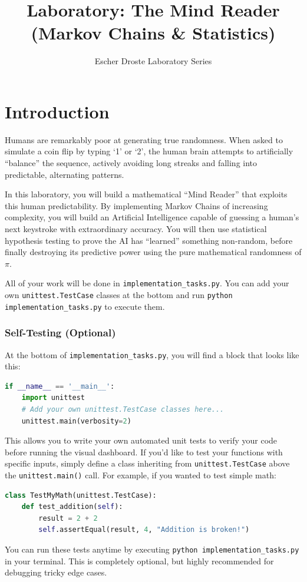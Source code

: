 \documentclass[12pt]{article}
\title{Laboratory: The Mind Reader (Markov Chains \& Statistics)}
\author{Escher Droste Laboratory Series}
\date{}
\begin{document}
\maketitle

\section*{Introduction}
Humans are remarkably poor at generating true randomness. When asked to simulate a coin flip by typing `1' or `2', the human brain attempts to artificially ``balance'' the sequence, actively avoiding long streaks and falling into predictable, alternating patterns.

In this laboratory, you will build a mathematical ``Mind Reader'' that exploits this human predictability. By implementing Markov Chains of increasing complexity, you will build an Artificial Intelligence capable of guessing a human's next keystroke with extraordinary accuracy. You will then use statistical hypothesis testing to prove the AI has ``learned'' something non-random, before finally destroying its predictive power using the pure mathematical randomness of $\pi$.

All of your work will be done in \texttt{implementation\_tasks.py}. You can add your own \lstinline|unittest.TestCase| classes at the bottom and run \lstinline|python implementation_tasks.py| to execute them.

\subsubsection*{Self-Testing (Optional)}
At the bottom of \lstinline|implementation_tasks.py|, you will find a block that looks like this:
\begin{lstlisting}[language=Python]
if __name__ == '__main__':
    import unittest
    # Add your own unittest.TestCase classes here...
    unittest.main(verbosity=2)
\end{lstlisting}
This allows you to write your own automated unit tests to verify your code before running the visual dashboard. If you'd like to test your functions with specific inputs, simply define a class inheriting from \lstinline|unittest.TestCase| above the \lstinline|unittest.main()| call. For example, if you wanted to test simple math:
\begin{lstlisting}[language=Python]
class TestMyMath(unittest.TestCase):
    def test_addition(self):
        result = 2 + 2
        self.assertEqual(result, 4, "Addition is broken!")
\end{lstlisting}
You can run these tests anytime by executing \lstinline|python implementation_tasks.py| in your terminal. This is completely optional, but highly recommended for debugging tricky edge cases.
\end{document}
